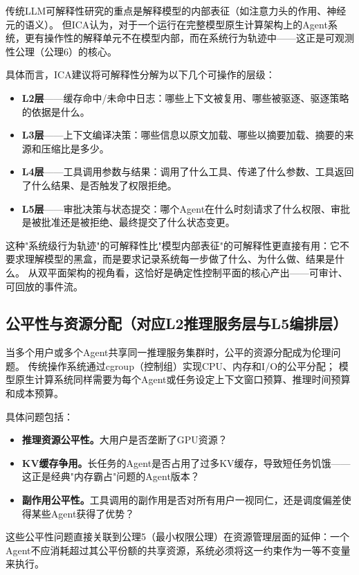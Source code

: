 传统LLM可解释性研究的重点是解释模型的内部表征（如注意力头的作用、神经元的语义）。
但ICA认为，对于一个运行在完整模型原生计算架构上的Agent系统，更有操作性的解释单元不在模型内部，而在系统行为轨迹中——这正是可观测性公理（公理6）的核心。

具体而言，ICA建议将可解释性分解为以下几个可操作的层级：

\begin{itemize}[nosep]
\item \textbf{L2层}——缓存命中/未命中日志：哪些上下文被复用、哪些被驱逐、驱逐策略的依据是什么。
\item \textbf{L3层}——上下文编译决策：哪些信息以原文加载、哪些以摘要加载、摘要的来源和压缩比是多少。
\item \textbf{L4层}——工具调用参数与结果：调用了什么工具、传递了什么参数、工具返回了什么结果、是否触发了权限拒绝。
\item \textbf{L5层}——审批决策与状态提交：哪个Agent在什么时刻请求了什么权限、审批是被批准还是被拒绝、最终提交了什么状态变更。
\end{itemize}

这种"系统级行为轨迹"的可解释性比"模型内部表征"的可解释性更直接有用：它不要求理解模型的黑盒，而是要求记录系统每一步做了什么、为什么做、结果是什么。
从双平面架构的视角看，这恰好是确定性控制平面的核心产出——可审计、可回放的事件流。

\subsection{公平性与资源分配（对应L2推理服务层与L5编排层）}
\label{sec:ethics-fairness}

当多个用户或多个Agent共享同一推理服务集群时，公平的资源分配成为伦理问题。
传统操作系统通过cgroup（控制组）实现CPU、内存和I/O的公平分配\cite{linux_cgroup_2026}；
模型原生计算系统同样需要为每个Agent或任务设定上下文窗口预算、推理时间预算和成本预算。

具体问题包括：
\begin{itemize}[nosep]
\item \textbf{推理资源公平性。}大用户是否垄断了GPU资源？
\item \textbf{KV缓存争用。}长任务的Agent是否占用了过多KV缓存，导致短任务饥饿——这正是经典"内存霸占"问题的Agent版本？
\item \textbf{副作用公平性。}工具调用的副作用是否对所有用户一视同仁，还是调度偏差使得某些Agent获得了优势？
\end{itemize}

这些公平性问题直接关联到公理5（最小权限公理）在资源管理层面的延伸：一个Agent不应消耗超过其公平份额的共享资源，系统必须将这一约束作为一等不变量来执行。

